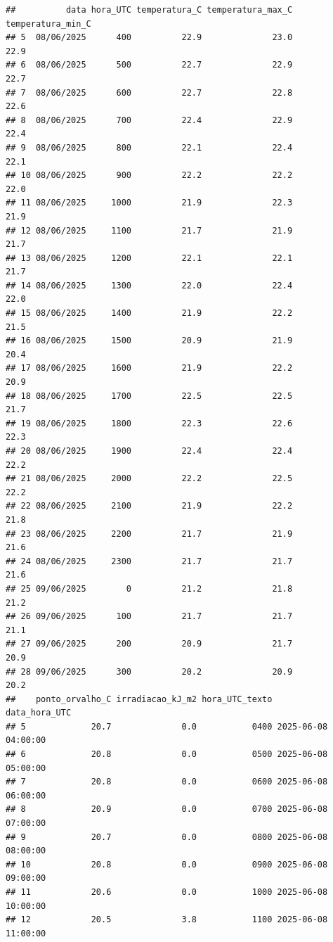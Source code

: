 \documentclass[
]{article}
\begin{document}
\begin{verbatim}
##          data hora_UTC temperatura_C temperatura_max_C temperatura_min_C
## 5  08/06/2025      400          22.9              23.0              22.9
## 6  08/06/2025      500          22.7              22.9              22.7
## 7  08/06/2025      600          22.7              22.8              22.6
## 8  08/06/2025      700          22.4              22.9              22.4
## 9  08/06/2025      800          22.1              22.4              22.1
## 10 08/06/2025      900          22.2              22.2              22.0
## 11 08/06/2025     1000          21.9              22.3              21.9
## 12 08/06/2025     1100          21.7              21.9              21.7
## 13 08/06/2025     1200          22.1              22.1              21.7
## 14 08/06/2025     1300          22.0              22.4              22.0
## 15 08/06/2025     1400          21.9              22.2              21.5
## 16 08/06/2025     1500          20.9              21.9              20.4
## 17 08/06/2025     1600          21.9              22.2              20.9
## 18 08/06/2025     1700          22.5              22.5              21.7
## 19 08/06/2025     1800          22.3              22.6              22.3
## 20 08/06/2025     1900          22.4              22.4              22.2
## 21 08/06/2025     2000          22.2              22.5              22.2
## 22 08/06/2025     2100          21.9              22.2              21.8
## 23 08/06/2025     2200          21.7              21.9              21.6
## 24 08/06/2025     2300          21.7              21.7              21.6
## 25 09/06/2025        0          21.2              21.8              21.2
## 26 09/06/2025      100          21.7              21.7              21.1
## 27 09/06/2025      200          20.9              21.7              20.9
## 28 09/06/2025      300          20.2              20.9              20.2
##    ponto_orvalho_C irradiacao_kJ_m2 hora_UTC_texto       data_hora_UTC
## 5             20.7              0.0           0400 2025-06-08 04:00:00
## 6             20.8              0.0           0500 2025-06-08 05:00:00
## 7             20.8              0.0           0600 2025-06-08 06:00:00
## 8             20.9              0.0           0700 2025-06-08 07:00:00
## 9             20.7              0.0           0800 2025-06-08 08:00:00
## 10            20.8              0.0           0900 2025-06-08 09:00:00
## 11            20.6              0.0           1000 2025-06-08 10:00:00
## 12            20.5              3.8           1100 2025-06-08 11:00:00

\end{verbatim}
\end{document}
